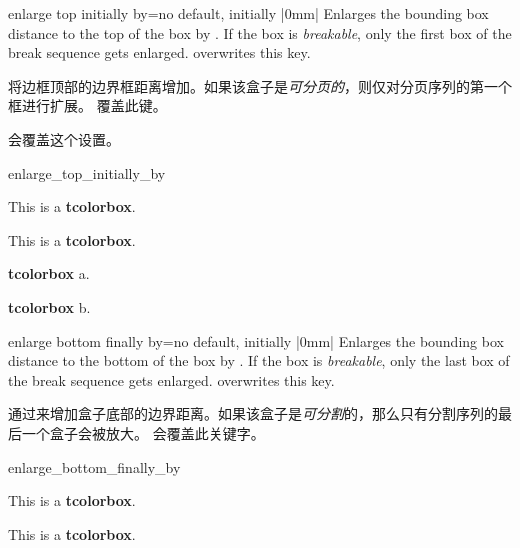 \begin{docTcbKey}{enlarge top initially by}{=}{no default, initially |0mm|}
Enlarges the bounding box distance to the top of the box by .
If the box is \emph{breakable}, only the first box of the break sequence
gets enlarged.  overwrites this key.

将边框顶部的边界框距离增加。如果该盒子是\emph{可分页的}，则仅对分页序列的第一个框进行扩展。  覆盖此键。 

 会覆盖这个设置。
\begin{exdispExample}{enlarge_top_initially_by}

\begin{tcolorbox}[enlarge top initially by=-5mm]
This is a \textbf{tcolorbox}.
\end{tcolorbox}
\begin{tcolorbox}[enlarge top initially by=5mm,enhanced,show bounding box]
This is a \textbf{tcolorbox}.
\end{tcolorbox}
\end{exdispExample}
\end{docTcbKey}

\begin{tcolorbox}[nobeforeafter]
\textbf{tcolorbox} a.
\end{tcolorbox}
\begin{tcolorbox}[nobeforeafter]
\textbf{tcolorbox} b.
\end{tcolorbox}




\begin{docTcbKey}{enlarge bottom finally by}{=}{no default, initially |0mm|}
Enlarges the bounding box distance to the bottom of the box by .
If the box is \emph{breakable}, only the last box of the break sequence
gets enlarged.  overwrites this key.

通过来增加盒子底部的边界距离。如果该盒子是\emph{可分割}的，那么只有分割序列的最后一个盒子会被放大。  会覆盖此关键字。

\begin{exdispExample}{enlarge_bottom_finally_by}

\begin{tcolorbox}[enlarge bottom finally by=5mm]
This is a \textbf{tcolorbox}.
\end{tcolorbox}
\begin{tcolorbox}[enlarge bottom finally by=-5mm,enhanced,show bounding box]
This is a \textbf{tcolorbox}.
\end{tcolorbox}
\end{exdispExample}
\end{docTcbKey}


